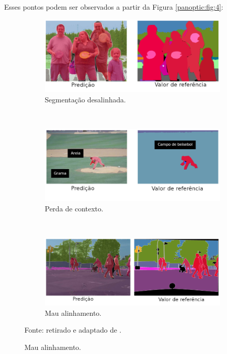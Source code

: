 Esses pontos podem ser observados a partir da Figura \ref{panoptic:fig:4}:

\begin{figure}[H]
   \caption{Falhas de segmentações panópticas.}
   \centering
   \label{panoptic:fig:4}
    \begin{subfigure}[t]{0.7\textwidth}
        \centering
        \includegraphics[width=1\linewidth]{recursos/imagens/panoptic/mau_adaptadas.png}
        \caption{Segmentação desalinhada.}
        \label{panoptic:fig:4.1}
    \end{subfigure}%
    ~ 

    \begin{subfigure}[t]{0.7\textwidth}
        \centering
        \includegraphics[width=1\linewidth]{recursos/imagens/panoptic/perda_contexto.png}
        \caption{Perda de contexto.}
        \label{panoptic:fig:4.2}
    \end{subfigure}%
    ~ 
    
    \begin{subfigure}[t]{0.7\textwidth}
        \centering
        \includegraphics[width=1\linewidth]{recursos/imagens/panoptic/mau_alinhamento.png}
        \caption{Mau alinhamento.}
        \label{panoptic:fig:4.3}
    \end{subfigure}

    \vspace*{1 cm}
    Fonte: retirado e adaptado de \cite{Christoph2019}.
\end{figure}

